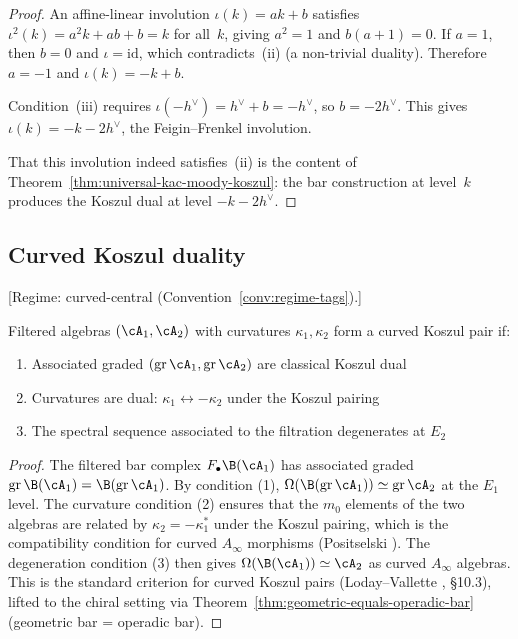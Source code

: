 \begin{proof}
An affine-linear involution $\iota(k) = ak + b$ satisfies
$\iota^2(k) = a^2k + ab + b = k$ for all~$k$, giving $a^2 = 1$
and $b(a+1) = 0$.  If $a = 1$, then $b = 0$ and $\iota = \mathrm{id}$,
which contradicts~(ii) (a non-trivial duality).  Therefore $a = -1$
and $\iota(k) = -k + b$.

Condition~(iii) requires $\iota(-h^\vee) = h^\vee + b = -h^\vee$,
so $b = -2h^\vee$.  This gives $\iota(k) = -k - 2h^\vee$, the
Feigin--Frenkel involution.

That this involution indeed satisfies~(ii) is the content of
Theorem~\ref{thm:universal-kac-moody-koszul}: the bar construction
at level~$k$ produces the Koszul dual at level $-k-2h^\vee$.
\end{proof}

\subsection{Curved Koszul duality}

\begin{theorem}\label{thm:curved-koszul-pairs}
\textup{[Regime: curved-central
\textup{(}Convention~\textup{\ref{conv:regime-tags})}.]}

Filtered algebras $(\cA_1, \cA_2)$ with curvatures $\kappa_1, \kappa_2$ form a curved Koszul pair if:
\begin{enumerate}
\item Associated graded $(\mathrm{gr}\,\cA_1, \mathrm{gr}\,\cA_2)$ are classical Koszul dual
\item Curvatures are dual: $\kappa_1 \leftrightarrow -\kappa_2$ under the Koszul pairing
\item The spectral sequence associated to the filtration degenerates at $E_2$
\end{enumerate}
\end{theorem}

\begin{proof}
The filtered bar complex $F_\bullet \B(\cA_1)$ has associated graded $\mathrm{gr}\,\B(\cA_1) = \B(\mathrm{gr}\,\cA_1)$.  By condition (1), $\Omega(\B(\mathrm{gr}\,\cA_1)) \simeq \mathrm{gr}\,\cA_2$ at the $E_1$ level.  The curvature condition (2) ensures that the $m_0$ elements of the two algebras are related by $\kappa_2 = -\kappa_1^*$ under the Koszul pairing, which is the compatibility condition for curved $A_\infty$ morphisms (Positselski \cite{Positselski11}).  The degeneration condition (3) then gives $\Omega(\B(\cA_1)) \simeq \cA_2$ as curved $A_\infty$ algebras.  This is the standard criterion for curved Koszul pairs (Loday--Vallette \cite{LV12}, \S10.3), lifted to the chiral setting via Theorem~\ref{thm:geometric-equals-operadic-bar} (geometric bar = operadic bar).
\end{proof}


